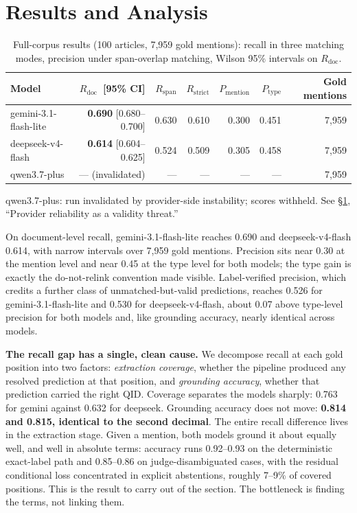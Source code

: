 \documentclass[sigconf,review]{acmart}
\newcommand{\Rdoc}{\ensuremath{R_{\mathrm{doc}}}}
\newcommand{\Rspan}{\ensuremath{R_{\mathrm{span}}}}
\newcommand{\Rstrict}{\ensuremath{R_{\mathrm{strict}}}}
\newcommand{\Pmention}{\ensuremath{P_{\mathrm{mention}}}}
\newcommand{\Ptype}{\ensuremath{P_{\mathrm{type}}}}
\begin{document}
\section{Results and Analysis}
\label{sec:results}

\begin{table}
  \caption{Full-corpus results (100 articles, 7,959 gold mentions): recall in
  three matching modes, precision under span-overlap matching, Wilson 95\%
  intervals on \Rdoc.}
  \label{tab:main}
  \begin{tabular}{lrrrrrr}
    \toprule
    Model & \Rdoc\ [95\% CI] & \Rspan & \Rstrict & \Pmention & \Ptype & Gold mentions \\
    \midrule
    gemini-3.1-flash-lite & \textbf{0.690} [0.680--0.700] & 0.630 & 0.610 & 0.300 & 0.451 & 7,959 \\
    deepseek-v4-flash     & \textbf{0.614} [0.604--0.625] & 0.524 & 0.509 & 0.305 & 0.458 & 7,959 \\
    qwen3.7-plus          & --- (invalidated) & --- & --- & --- & --- & 7,959 \\
    \bottomrule
  \end{tabular}

  \smallskip
  {\footnotesize qwen3.7-plus: run invalidated by provider-side instability;
  scores withheld. See \S\ref{sec:results}, ``Provider reliability as a
  validity threat.''\par}
\end{table}

On document-level recall, gemini-3.1-flash-lite reaches 0.690 and
deepseek-v4-flash 0.614, with narrow intervals over 7,959 gold mentions.
Precision sits near 0.30 at the mention level and near 0.45 at the type level
for both models; the type gain is exactly the do-not-relink convention made
visible. Label-verified precision, which credits a further class of
unmatched-but-valid predictions, reaches 0.526 for gemini-3.1-flash-lite and
0.530 for deepseek-v4-flash, about 0.07 above type-level precision for both
models and, like grounding accuracy, nearly identical across models.

\textbf{The recall gap has a single, clean cause.} We decompose recall at each
gold position into two factors: \emph{extraction coverage}, whether the
pipeline produced any resolved prediction at that position, and
\emph{grounding accuracy}, whether that prediction carried the right QID.
Coverage separates the models sharply: 0.763 for gemini against 0.632 for
deepseek. Grounding accuracy does not move: \textbf{0.814 and 0.815, identical to the second decimal}. The entire recall difference lives in the extraction
stage. Given a mention, both models ground it about equally well, and well in
absolute terms: accuracy runs 0.92--0.93 on the deterministic exact-label path
and 0.85--0.86 on judge-disambiguated cases, with the residual conditional
loss concentrated in explicit abstentions, roughly 7--9\% of covered
positions. This is the result to carry out of the section. The bottleneck is
finding the terms, not linking them.
\end{document}

